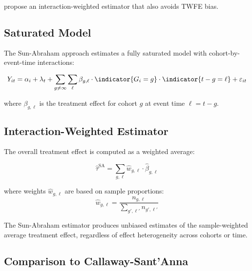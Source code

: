 \citet{sun2021estimating} propose an interaction-weighted estimator that also avoids TWFE bias.

\subsection{Saturated Model}

The Sun-Abraham approach estimates a fully saturated model with cohort-by-event-time interactions:

\begin{equation}
Y_{it} = \alpha_i + \lambda_t + \sum_{g \neq \infty} \sum_{\ell} \beta_{g,\ell} \cdot \indicator{G_i = g} \cdot \indicator{t - g = \ell} + \varepsilon_{it}
\label{eq:sun_abraham}
\end{equation}

where $\beta_{g,\ell}$ is the treatment effect for cohort $g$ at event time $\ell = t - g$.

\subsection{Interaction-Weighted Estimator}

The overall treatment effect is computed as a weighted average:

\begin{equation}
\hat{\tau}^{\text{SA}} = \sum_{g,\ell} \hat{w}_{g,\ell} \cdot \hat{\beta}_{g,\ell}
\end{equation}

where weights $\hat{w}_{g,\ell}$ are based on sample proportions:
\begin{equation}
\hat{w}_{g,\ell} = \frac{n_{g,\ell}}{\sum_{g',\ell'} n_{g',\ell'}}
\end{equation}

\begin{theorem}
The Sun-Abraham estimator produces unbiased estimates of the sample-weighted average treatment effect, regardless of effect heterogeneity across cohorts or time.
\end{theorem}

\subsection{Comparison to Callaway-Sant'Anna}

